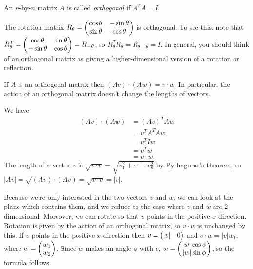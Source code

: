 \documentclass{article}
\begin{document}
\begin{Definition}
An \(n\)-by-\(n\) matrix \(A\) is called {\em orthogonal} if
\(A^TA=I\).


\end{Definition}
\begin{Example}
The rotation matrix \(R_{\theta}=\begin{pmatrix} \cos\theta & -\sin\theta
\\ \sin\theta & \cos\theta\end{pmatrix}\) is orthogonal. To see this, note
that \(R_{\theta}^T=\begin{pmatrix} \cos\theta & \sin\theta \\ -\sin\theta &
\cos\theta\end{pmatrix}=R_{-\theta}\), so
\(R_{\theta}^TR_{\theta}=R_{\theta-\theta}=I\). In general, you
should think of an orthogonal matrix as giving a higher-dimensional
version of a rotation or reflection.


\end{Example}
\begin{Lemma}
If \(A\) is an orthogonal matrix then \((Av)\cdot(Aw)=v\cdot w\). In
particular, the action of an orthogonal matrix doesn't change the
lengths of vectors.
\end{Lemma}
\begin{Proof}
We have
\begin{align*}
(Av)\cdot(Aw)&=(Av)^TAw\\
&=v^TA^TAw\\
&=v^TIw\\
&=v^Tw\\
&=v\cdot w.
\end{align*}
The length of a vector \(v\) is \(\sqrt{v\cdot
v}=\sqrt{v_1^2+\cdots+v_n^2}\) by Pythagoras's theorem, so
\(|Av|=\sqrt{(Av)\cdot(Av)}=\sqrt{v\cdot v}=|v|\). \qedhere


\end{Proof}
\begin{Proof}\label{prf:thm:dot}
Because we're only interested in the two vectors \(v\) and \(w\), we
can look at the plane which contains them, and we reduce to the case
where \(v\) and \(w\) are 2-dimensional. Moreover, we can rotate so
that \(v\) points in the positive \(x\)-direction. Rotation is given
by the action of an orthogonal matrix, so \(v\cdot w\) is unchanged
by this. If \(v\) points in the positive \(x\)-direction then
\(v=\begin{pmatrix} |v| & 0\end{pmatrix}\) and \(v\cdot w=|v|w_1\), where \(w=\begin{pmatrix}
w_1\\ w_2\end{pmatrix}\). Since \(w\) makes an angle \(\phi\) with \(v\),
\(w=\begin{pmatrix} |w|\cos\phi \\ |w|\sin\phi\end{pmatrix}\), so the formula
follows. \qedhere


\end{Proof}
\clearpage
\end{document}
